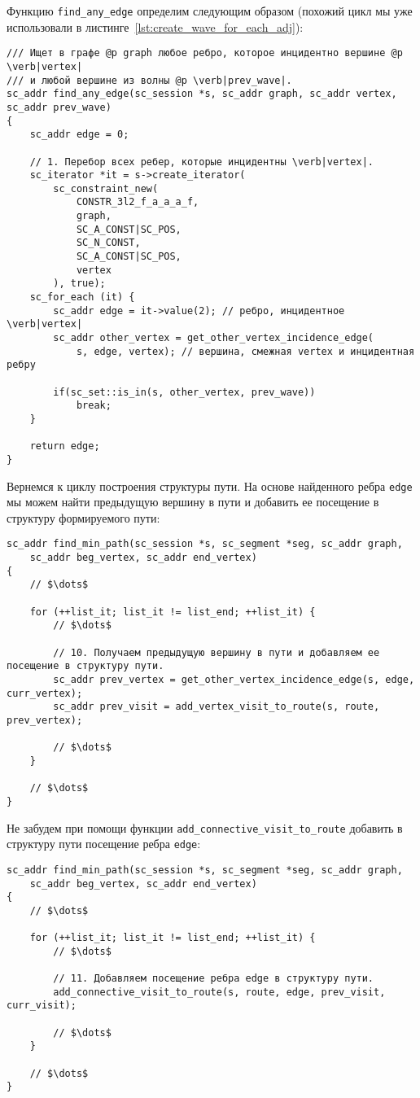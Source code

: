 Функцию \lstinline|find_any_edge| определим следующим образом (похожий
цикл мы уже использовали в
листинге~\ref{lst:create_wave_for_each_adj}):

\begin{lstlisting}[texcl]
/// Ищет в графе @p graph любое ребро, которое инцидентно вершине @p \verb|vertex|
/// и любой вершине из волны @p \verb|prev_wave|.
sc_addr find_any_edge(sc_session *s, sc_addr graph, sc_addr vertex, sc_addr prev_wave)
{
    sc_addr edge = 0;

    // 1. Перебор всех ребер, которые инцидентны \verb|vertex|.
    sc_iterator *it = s->create_iterator(
        sc_constraint_new(
            CONSTR_3l2_f_a_a_a_f,
            graph,
            SC_A_CONST|SC_POS,
            SC_N_CONST,
            SC_A_CONST|SC_POS,
            vertex
        ), true);
    sc_for_each (it) {
        sc_addr edge = it->value(2); // ребро, инцидентное  \verb|vertex|
        sc_addr other_vertex = get_other_vertex_incidence_edge(
            s, edge, vertex); // вершина, смежная vertex и инцидентная ребру

        if(sc_set::is_in(s, other_vertex, prev_wave))
            break;
    }

    return edge;
}
\end{lstlisting}

Вернемся к циклу построения структуры пути. На основе найденного ребра
\lstinline|edge| мы можем найти предыдущую вершину в пути и добавить
ее посещение в структуру формируемого пути:

\begin{lstlisting}[texcl]
sc_addr find_min_path(sc_session *s, sc_segment *seg, sc_addr graph,
    sc_addr beg_vertex, sc_addr end_vertex)
{
    // $\dots$

    for (++list_it; list_it != list_end; ++list_it) {
        // $\dots$

        // 10. Получаем предыдущую вершину в пути и добавляем ее посещение в структуру пути.
        sc_addr prev_vertex = get_other_vertex_incidence_edge(s, edge, curr_vertex);
        sc_addr prev_visit = add_vertex_visit_to_route(s, route, prev_vertex);

        // $\dots$
    }

    // $\dots$
}
\end{lstlisting}

Не забудем при помощи функции
\lstinline|add_connective_visit_to_route| добавить в структуру пути
посещение ребра \lstinline|edge|:

\begin{lstlisting}[texcl]
sc_addr find_min_path(sc_session *s, sc_segment *seg, sc_addr graph,
    sc_addr beg_vertex, sc_addr end_vertex)
{
    // $\dots$

    for (++list_it; list_it != list_end; ++list_it) {
        // $\dots$

        // 11. Добавляем посещение ребра edge в структуру пути.
        add_connective_visit_to_route(s, route, edge, prev_visit, curr_visit);

        // $\dots$
    }

    // $\dots$
}
\end{lstlisting}

